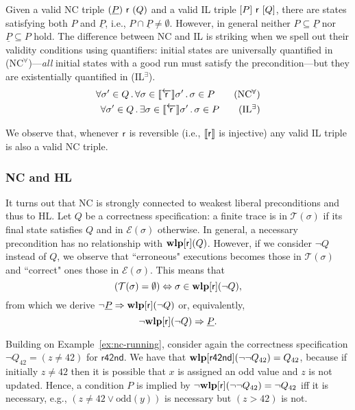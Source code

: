 Given a valid NC triple $(\underline{P})~\mathsf{r}~(Q)$ and a valid IL triple $[P]~\mathsf{r}~[Q]$, there are states satisfying both $P$ and $\underline{P}$, i.e., $P \cap \underline{P} \neq \emptyset$. However, in general neither $P \subseteq \underline{P}$ nor $\underline{P} \subseteq P$ hold. The difference between NC and IL is striking when we spell out their validity conditions using quantifiers: initial states are universally quantified in (NC$^{\forall}$)---\emph{all} initial states with a good run must satisfy the precondition---but they are existentially quantified in (IL$^{\exists}$).
\begin{align*}
	\forall \sigma' \in Q \sdot \forall \sigma\in \bwsem{\regr}\sigma' \sdot\sigma\in P
	\tag{NC$^{\forall}$} \\
	\forall \sigma' \in Q \sdot \exists \sigma\in \bwsem{\regr}\sigma' \sdot \sigma \in P
	\tag{IL$^{\exists}$}
\end{align*}

We observe that, whenever $\mathsf{r}$ is reversible (i.e., $\llbracket\mathsf{r}\rrbracket$ is injective) any valid IL triple is also a valid NC triple.

\subsubsection{NC and HL}
It turns out that NC is strongly connected to weakest liberal preconditions and thus to HL.
Let $Q$ be a correctness specification: a finite trace is in $\mathcal{T}(\sigma)$ if its final state satisfies $Q$ and in $\mathcal{E}(\sigma)$ otherwise.
In general, a necessary precondition has no relationship with $\textbf{wlp}[\mathsf{r}](Q)$. However, if we consider $\lnot Q$ instead of $Q$, we observe that ``erroneous" executions becomes those in $\mathcal{T}(\sigma)$ and ``correct" ones those in $\mathcal{E}(\sigma)$. This means that
\[
(\mathcal{T}(\sigma) = \emptyset) \Leftrightarrow \sigma \in \textbf{wlp}[\mathsf{r}](\lnot Q),
\]
from which we derive
\(\lnot \underline{P} \Rightarrow \textbf{wlp}[\mathsf{r}](\lnot Q)\)
or, equivalently,
\[\lnot \textbf{wlp}[\mathsf{r}](\lnot Q) \Rightarrow \underline{P} .\]

\begin{example}
	Building on Example~\ref{ex:nc-running}, consider again the correctness specification $\neg Q_{42} = (z\neq 42)$ for $\mathsf{r42nd}$. We have that $\textbf{wlp}[\mathsf{r42nd}](\lnot \lnot Q_{42}) = Q_{42}$, because if initially $z \neq 42$ then it is possible that $x$ is assigned an odd value and $z$ is not updated.
	Hence, a condition $P$ is implied by $\lnot \textbf{wlp}[\mathsf{r}](\lnot\lnot Q_{42}) = \lnot Q_{42}$ iff it is necessary, e.g., $(z\neq 42 \vee \text{odd}(y))$ is necessary but $(z > 42)$ is not.
\end{example}

